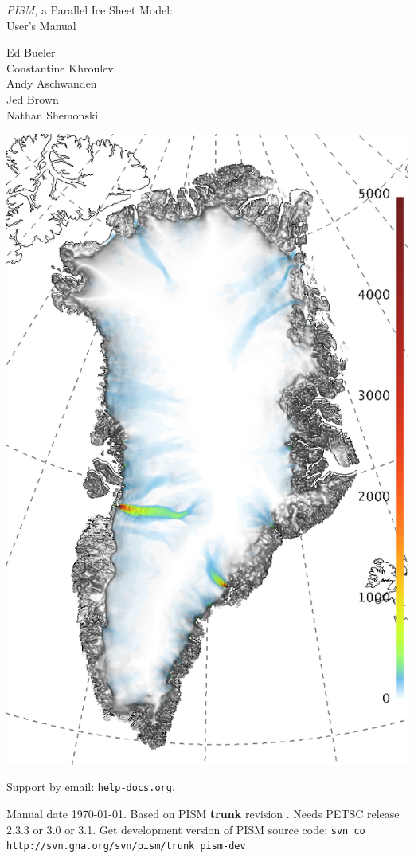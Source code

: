 \documentclass[titlepage,letterpaper,final]{scrartcl}
\newcommand{\PISMREV}{\textbf{trunk} revision }
\newcommand{\PETSCREL}{2.3.3 or 3.0 or 3.1}
\newcommand{\PISMDOWNLOADMSG}{Get development version of PISM source code: \quad\texttt{svn co http://svn.gna.org/svn/pism/trunk pism-dev} \quad}
\begin{document}
\graphicspath{{figs/}}

\begin{titlepage}
  \begin{center}
    {\huge{} \emph{PISM}, a Parallel Ice Sheet Model:\\\medskip User's Manual}
    \vspace{1cm}

    {\Large Ed Bueler \\ Constantine Khroulev \\ Andy Aschwanden \\ Jed Brown \\ Nathan Shemonski}
    \vspace{1cm}

    \includegraphics[width=3.in,keepaspectratio=true]{grn-grl-csurf}
    \vfill

    \small Support by email: \texttt{help\@@pism-docs.org}. 

    Manual date \today. Based on PISM \PISMREV.  Needs PETSC release \PETSCREL. \PISMDOWNLOADMSG
  \end{center}
\end{titlepage}
\end{document}
